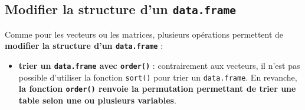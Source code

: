 \documentclass[12pt,twosided, notitlepage]{book}
\newenvironment{Shaded}{}{}
\newcommand{\KeywordTok}[1]{\textcolor[rgb]{0.00,0.00,1.00}{#1}}
\newcommand{\StringTok}[1]{\textcolor[rgb]{0.00,0.50,0.50}{#1}}
\newcommand{\CommentTok}[1]{\textcolor[rgb]{0.00,0.50,0.00}{#1}}
\newcommand{\OperatorTok}[1]{#1}
\newcommand{\NormalTok}[1]{#1}
\providecommand{\tightlist}{%
  \setlength{\itemsep}{0pt}\setlength{\parskip}{0pt}}
\newif \ifsol
\renewenvironment{Shaded}{\begin{snugshade}}{\end{snugshade}}
\begin{document}
\begin{enumerate}
\begin{enumerate}
    \ifsol 

    \begin{center} \rule{0.5\linewidth}{\linethickness}\end{center}

\begin{Shaded}
\begin{Highlighting}[]
\CommentTok{# On utilise la valeur de seuil pour créer une version}
\CommentTok{# modifiée de la pondération (par exemple avec ifelse())}
\NormalTok{eec}\OperatorTok{$}\NormalTok{newpond <-}\StringTok{ }\KeywordTok{ifelse}\NormalTok{(}
\NormalTok{  eec}\OperatorTok{$}\NormalTok{extri1613 }\OperatorTok{>}\StringTok{ }\NormalTok{seuil}
\NormalTok{  , seuil}
\NormalTok{  , eec}\OperatorTok{$}\NormalTok{extri1613}
\NormalTok{)}

\CommentTok{# Caractéristiques générales de newpond}
\KeywordTok{summary}\NormalTok{(eec}\OperatorTok{$}\NormalTok{newpond)}
\NormalTok{  ##    Min. 1st Qu.  Median    Mean 3rd Qu.    Max. }
\NormalTok{  ##   156.4  1088.2  1334.6  1419.0  1636.8  3958.6}
\end{Highlighting}
\end{Shaded}

    \begin{center} \rule{0.5\linewidth}{\linethickness}\end{center}

    \bigskip  \fi 
  \end{enumerate}
\end{enumerate}

\subsection{\texorpdfstring{Modifier la structure d'un
\texttt{data.frame}}{Modifier la structure d'un data.frame}}\label{modifier-la-structure-dun-data.frame}

Comme pour les vecteurs ou les matrices, plusieurs opérations permettent
de \textbf{modifier la structure d'un \texttt{data.frame}} :

\begin{itemize}
\tightlist
\item
  \textbf{trier un \texttt{data.frame} avec
  \texttt{order()}} : contrairement aux
  vecteurs, il n'est pas possible d'utiliser la fonction \texttt{sort()}
  pour trier un \texttt{data.frame}. En revanche, \textbf{la fonction
  \texttt{order()} renvoie la permutation permettant de trier une table
  selon une ou plusieurs variables}.
\end{itemize}
\end{document}
